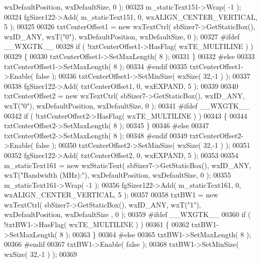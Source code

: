 \begin{DoxyCode}
      wxDefaultPosition, wxDefaultSize, 0 );
00323     m_staticText151->Wrap( -1 );
00324     fgSizer122->Add( m_staticText151, 0, wxALIGN\_CENTER\_VERTICAL, 5 );
00325     
00326     txtCenterOffset1 = \textcolor{keyword}{new} wxTextCtrl( sbSizer7->GetStaticBox(), wxID\_ANY, wxT(\textcolor{stringliteral}{"0"}), wxDefaultPosition, 
      wxDefaultSize, 0 );
00327 \textcolor{preprocessor}{    #ifdef \_\_WXGTK\_\_}
00328     \textcolor{keywordflow}{if} ( !txtCenterOffset1->HasFlag( wxTE\_MULTILINE ) )
00329     \{
00330     txtCenterOffset1->SetMaxLength( 8 );
00331     \}
00332 \textcolor{preprocessor}{    #else}
00333     txtCenterOffset1->SetMaxLength( 8 );
00334 \textcolor{preprocessor}{    #endif}
00335     txtCenterOffset1->Enable( \textcolor{keyword}{false} );
00336     txtCenterOffset1->SetMinSize( wxSize( 32,-1 ) );
00337     
00338     fgSizer122->Add( txtCenterOffset1, 0, wxEXPAND, 5 );
00339     
00340     txtCenterOffset2 = \textcolor{keyword}{new} wxTextCtrl( sbSizer7->GetStaticBox(), wxID\_ANY, wxT(\textcolor{stringliteral}{"0"}), wxDefaultPosition, 
      wxDefaultSize, 0 );
00341 \textcolor{preprocessor}{    #ifdef \_\_WXGTK\_\_}
00342     \textcolor{keywordflow}{if} ( !txtCenterOffset2->HasFlag( wxTE\_MULTILINE ) )
00343     \{
00344     txtCenterOffset2->SetMaxLength( 8 );
00345     \}
00346 \textcolor{preprocessor}{    #else}
00347     txtCenterOffset2->SetMaxLength( 8 );
00348 \textcolor{preprocessor}{    #endif}
00349     txtCenterOffset2->Enable( \textcolor{keyword}{false} );
00350     txtCenterOffset2->SetMinSize( wxSize( 32,-1 ) );
00351     
00352     fgSizer122->Add( txtCenterOffset2, 0, wxEXPAND, 5 );
00353     
00354     m_staticText161 = \textcolor{keyword}{new} wxStaticText( sbSizer7->GetStaticBox(), wxID\_ANY, wxT(\textcolor{stringliteral}{"Bandwidth (MHz):"}), 
      wxDefaultPosition, wxDefaultSize, 0 );
00355     m_staticText161->Wrap( -1 );
00356     fgSizer122->Add( m_staticText161, 0, wxALIGN\_CENTER\_VERTICAL, 5 );
00357     
00358     txtBW1 = \textcolor{keyword}{new} wxTextCtrl( sbSizer7->GetStaticBox(), wxID\_ANY, wxT(\textcolor{stringliteral}{"1"}), wxDefaultPosition, wxDefaultSize
      , 0 );
00359 \textcolor{preprocessor}{    #ifdef \_\_WXGTK\_\_}
00360     \textcolor{keywordflow}{if} ( !txtBW1->HasFlag( wxTE\_MULTILINE ) )
00361     \{
00362     txtBW1->SetMaxLength( 8 );
00363     \}
00364 \textcolor{preprocessor}{    #else}
00365     txtBW1->SetMaxLength( 8 );
00366 \textcolor{preprocessor}{    #endif}
00367     txtBW1->Enable( \textcolor{keyword}{false} );
00368     txtBW1->SetMinSize( wxSize( 32,-1 ) );
00369     

\end{DoxyCode}
